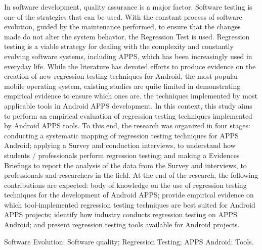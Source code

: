 


\abstract


In software development, quality assurance is a major factor. Software testing is one of the strategies that can be used. With the constant process of software evolution, guided by the maintenance performed, to ensure that the changes made do not alter the system behavior, the Regression Test is used. Regression testing is a viable strategy for dealing with the complexity and constantly evolving software systems, including APPS, which has been increasingly used in everyday life. While the literature has devoted efforts to produce evidence on the creation of new regression testing techniques for Android, the most popular mobile operating system, existing studies are quite limited in demonstrating empirical evidence to ensure which ones are. the techniques implemented by most applicable tools in Android \ac {APPS} development. In this context, this study aims to perform an empirical evaluation of regression testing techniques implemented by Android \ac {APPS} tools. To this end, the research was organized in four stages: conducting a systematic mapping of regression testing techniques for \ac {APPS} Android; applying a Survey and conduction interviews, to understand how students / professionals perform regression testing; and making a Evidences Briefings to report the analysis of the data from the Survey and interviews, to professionals and researchers in the field. At the end of the research, the following contributions are expected: body of knowledge on the use of regression testing techniques for the development of Android \ac {APPS}; provide empirical evidence on which tool-implemented regression testing techniques are best suited for Android \ac {APPS} projects; identify how industry conducts regression testing on \ac {APPS} Android; and present regression testing tools available for Android projects.

\begin{keywords}
Software Evolution; Software quality; Regression Testing; APPS Android; Tools.%
\end{keywords}